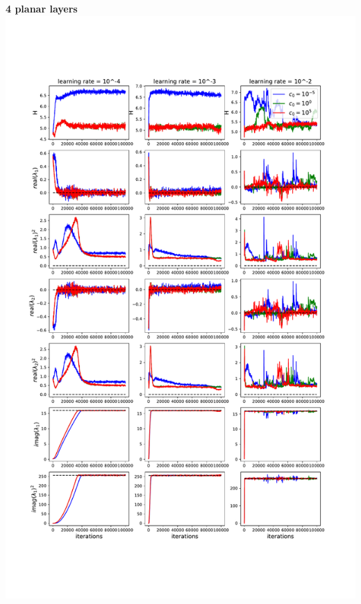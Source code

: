 \documentclass[11pt]{article}
\begin{document}
\clearpage
\begin{center}
\textbf{4 planar layers} \\
\includegraphics[scale=.45]{images/learnA_4P.pdf} \\
\end{center}
\end{document}
